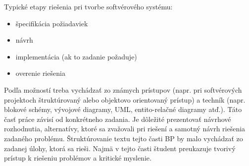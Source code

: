Typické etapy riešenia pri tvorbe softvérového systému:
\begin{itemize}
    \item špecifikácia požiadaviek
    \item návrh
    \item implementácia (ak to zadanie požaduje)
    \item overenie riešenia
\end{itemize}

Podľa možností treba vychádzať zo známych prístupov (napr. pri softvérových projektoch štruktúrovaný alebo objektovo orientovaný prístup) a techník (napr. blokové schémy, vývojové diagramy, UML, entito-relačné diagramy atď.). Táto časť práce závisí od konkrétneho zadania.
Je dôležité prezentovať návrhové rozhodnutia, alternatívy, ktoré sa zvažovali pri riešení a samotný návrh riešenia zadaného problému. Štruktúrovanie textu tejto časti BP by malo vychádzať zo zadanej úlohy, ktorá sa rieši. Najmä v tejto časti študent preukazuje tvorivý prístup k riešeniu problémov a kritické myslenie.
\emptypage 
